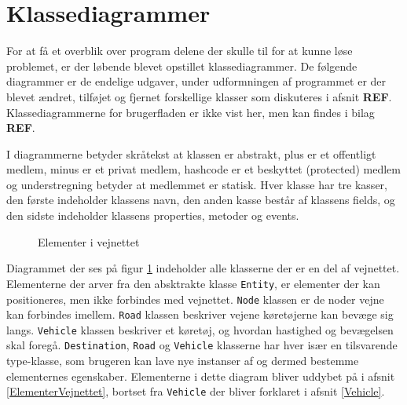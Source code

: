 \section{Klassediagrammer}\label{Klassediagrammer}
For at få et overblik over program delene der skulle til for at kunne løse problemet, er der løbende blevet opstillet klassediagrammer. De følgende diagrammer er de endelige udgaver, under udformningen af programmet er der blevet ændret, tilføjet og fjernet forskellige klasser som diskuteres i afsnit \textbf{REF}. Klassediagrammerne for brugerfladen er ikke vist her, men kan findes i bilag \textbf{REF}.

\vspace{5mm}

I diagrammerne betyder skråtekst at klassen er abstrakt, plus er et offentligt medlem, minus er et privat medlem, hashcode er et beskyttet (protected) medlem og understregning betyder at medlemmet er statisk. Hver klasse har tre kasser, den første indeholder klassens navn, den anden kasse består af klassens fields, og den sidste indeholder klassens properties, metoder og events.

\begin{figure}[H]
    \centering
    \caption{Elementer i vejnettet}
    \label{kdVejElementer}
\end{figure}

Diagrammet der ses på figur \ref{kdVejElementer} indeholder alle klasserne der er en del af vejnettet. Elementerne der arver fra den absktrakte klasse \texttt{Entity}, er elementer der kan positioneres, men ikke forbindes med vejnettet. \texttt{Node} klassen er de noder vejne kan forbindes imellem. \texttt{Road} klassen beskriver vejene køretøjerne kan bevæge sig langs. \texttt{Vehicle} klassen beskriver et køretøj, og hvordan hastighed og bevægelsen skal foregå. \texttt{Destination}, \texttt{Road} og \texttt{Vehicle} klasserne har hver især en tilsvarende type-klasse, som brugeren kan lave nye instanser af og dermed bestemme elementernes egenskaber. Elementerne i dette diagram bliver uddybet på i afsnit \ref{ElementerVejnettet}, bortset fra \texttt{Vehicle} der bliver forklaret i afsnit \ref{Vehicle}.

